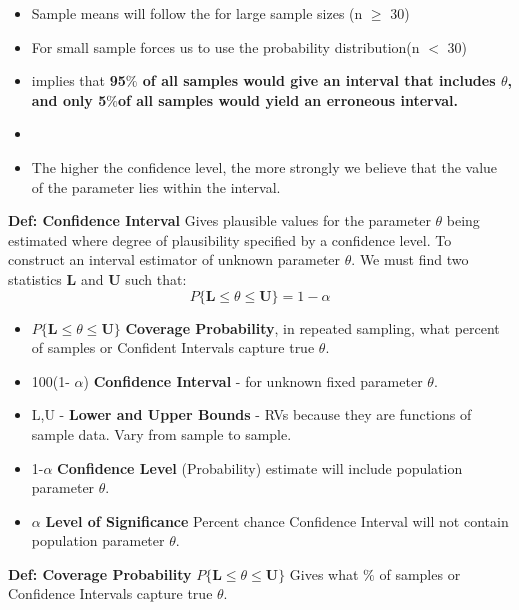 \documentclass[]{article}
\begin{document}
\begin{itemize}
	\item Sample means will follow the  for large sample sizes (n $\ge$ 30)
	\item For small sample  forces us to use the  probability distribution(n $<$ 30)
	\item {} implies that \textbf{95$\%$ of all samples would give an interval that includes $\theta$, and only 5$\%$of all samples would yield an erroneous interval.}
	\item {}
	\item The higher the confidence level, the more strongly we believe that the value of the parameter lies within the interval.
\end{itemize}
\Large\textbf{Def: Confidence Interval}
\newline Gives plausible values for the parameter $\theta$ being estimated where degree of plausibility specified by a confidence level.
\newline
\newline To construct an interval estimator of unknown parameter $\theta$. We must find two statistics \textbf{L} and \textbf{U} such that:
 \[  P \{\textbf{L} \le \theta \le \textbf{U}  \}  = 1 - \alpha  \] 
\begin{itemize}
	\item $P \{\textbf{L} \le \theta \le \textbf{U} \}$ \textbf{Coverage Probability}, in repeated sampling, what percent of samples or Confident Intervals capture true $\theta$.
	\item 100(1- $\alpha$) \textbf{Confidence Interval }- for unknown fixed parameter $\theta$.
	\item L,U - \textbf{Lower and Upper Bounds} - RVs because they are functions of sample data. Vary from sample to sample.
	\item 1-$\alpha$ \textbf{Confidence Level} (Probability) estimate will include population parameter $\theta$.
	\item $\alpha$ \textbf{Level of Significance} Percent chance Confidence Interval will not contain population parameter $\theta$.
\end{itemize}
\Large\textbf{Def: Coverage Probability}
\newline $P \{\textbf{L} \le \theta \le \textbf{U} \}$ Gives what $\%$ of samples or Confidence Intervals capture true $\theta$.
\end{document}
